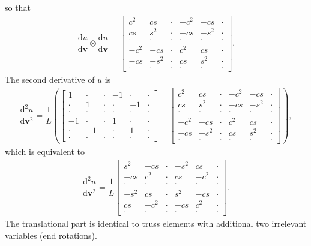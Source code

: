 \documentclass[11pt]{article}
\begin{document}
so that
\begin{gather}
\dfrac{\mathrm{d}u}{\mathrm{d}\mathbf{v}}\otimes\dfrac{\mathrm{d}u}{\mathrm{d}\mathbf{v}}=\begin{bmatrix}
	c^2   & cs    & \cdot & -c^2  & -cs   & \cdot \\
	cs    & s^2   & \cdot & -cs   & -s^2  & \cdot \\
	\cdot & \cdot & \cdot & \cdot & \cdot & \cdot \\
	-c^2  & -cs   & \cdot & c^2   & cs    & \cdot \\
	-cs   & -s^2  & \cdot & cs    & s^2   & \cdot \\
	\cdot & \cdot & \cdot & \cdot & \cdot & \cdot
\end{bmatrix}.
\end{gather}
The second derivative of $u$ is
\begin{gather}
\dfrac{\mathrm{d}^2u}{\mathrm{d}\mathbf{v}^2}=\dfrac{1}{L}\left(\begin{bmatrix}
	1     & \cdot & \cdot & -1    & \cdot & \cdot \\
	\cdot & 1     & \cdot & \cdot & -1    & \cdot \\
	\cdot & \cdot & \cdot & \cdot & \cdot & \cdot \\
	-1    & \cdot & \cdot & 1     & \cdot & \cdot \\
	\cdot & -1    &       & \cdot & 1     & \cdot \\
	\cdot & \cdot & \cdot & \cdot & \cdot & \cdot
\end{bmatrix}-
\begin{bmatrix}
	c^2   & cs    & \cdot & -c^2  & -cs   & \cdot \\
	cs    & s^2   & \cdot & -cs   & -s^2  & \cdot \\
	\cdot & \cdot & \cdot & \cdot & \cdot & \cdot \\
	-c^2  & -cs   & \cdot & c^2   & cs    & \cdot \\
	-cs   & -s^2  & \cdot & cs    & s^2   & \cdot \\
	\cdot & \cdot & \cdot & \cdot & \cdot & \cdot
\end{bmatrix}\right),
\end{gather}
which is equivalent to
\begin{gather}
\dfrac{\mathrm{d}^2u}{\mathrm{d}\mathbf{v}^2}=\dfrac{1}{L}
\begin{bmatrix}
	s^2   & -cs   & \cdot & -s^2  & cs    & \cdot \\
	-cs   & c^2   & \cdot & cs    & -c^2  & \cdot \\
	\cdot & \cdot & \cdot & \cdot & \cdot & \cdot \\
	-s^2  & cs    & \cdot & s^2   & -cs   & \cdot \\
	cs    & -c^2  & \cdot & -cs   & c^2   & \cdot \\
	\cdot & \cdot & \cdot & \cdot & \cdot & \cdot
\end{bmatrix}.
\end{gather}
The translational part is identical to truss elements with additional two irrelevant variables (end rotations).
\end{document}
